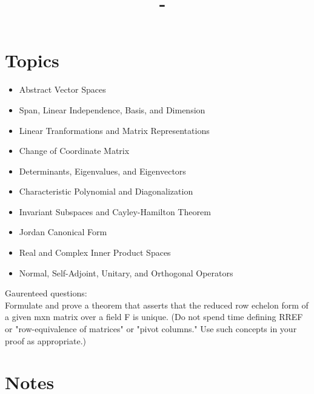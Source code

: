 \documentclass[answers,12pt,addpoints]{exam}
\author{\name}
\title{\course \ - \assignment}
\begin{document}
\maketitle

\tableofcontents
\newpage
\section*{Topics}
\begin{itemize}
    \item Abstract Vector Spaces
    \item Span, Linear Independence, Basis, and Dimension
    \item Linear Tranformations and Matrix Representations
    \item Change of Coordinate Matrix
    \item Determinants, Eigenvalues, and Eigenvectors
    \item Characteristic Polynomial and Diagonalization
    \item Invariant Subspaces and Cayley-Hamilton Theorem
    \item Jordan Canonical Form
    \item Real and Complex Inner Product Spaces
    \item Normal, Self-Adjoint, Unitary, and Orthogonal Operators
\end{itemize}
Gaurenteed questions:\\
Formulate and prove a theorem that asserts that the reduced row
echelon form of a given mxn matrix over a field F is unique.  (Do not
spend time defining RREF or "row-equivalence of matrices" or "pivot
columns."  Use such concepts in your proof as appropriate.)\\
\section{Notes}
\end{document}
